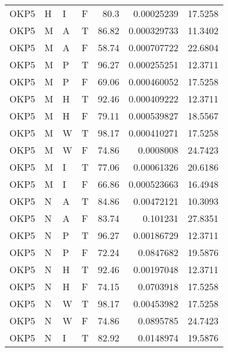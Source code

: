 \begin{longtable}{llllrrr}
    OKP5     & H         & I         & F          & 80.3       & 0.00025239  & 17.5258  \\
    OKP5     & M         & A         & T          & 86.82      & 0.000329733 & 11.3402  \\
    OKP5     & M         & A         & F          & 58.74      & 0.000707722 & 22.6804  \\
    OKP5     & M         & P         & T          & 96.27      & 0.000255251 & 12.3711  \\
    OKP5     & M         & P         & F          & 69.06      & 0.000460052 & 17.5258  \\
    OKP5     & M         & H         & T          & 92.46      & 0.000409222 & 12.3711  \\
    OKP5     & M         & H         & F          & 79.11      & 0.000539827 & 18.5567  \\
    OKP5     & M         & W         & T          & 98.17      & 0.000410271 & 17.5258  \\
    OKP5     & M         & W         & F          & 74.86      & 0.0008008   & 24.7423  \\
    OKP5     & M         & I         & T          & 77.06      & 0.00061326  & 20.6186  \\
    OKP5     & M         & I         & F          & 66.86      & 0.000523663 & 16.4948  \\
    OKP5     & N         & A         & T          & 84.86      & 0.00472121  & 10.3093  \\
    OKP5     & N         & A         & F          & 83.74      & 0.101231    & 27.8351  \\
    OKP5     & N         & P         & T          & 96.27      & 0.00186729  & 12.3711  \\
    OKP5     & N         & P         & F          & 72.24      & 0.0847682   & 19.5876  \\
    OKP5     & N         & H         & T          & 92.46      & 0.00197048  & 12.3711  \\
    OKP5     & N         & H         & F          & 74.15      & 0.0703918   & 17.5258  \\
    OKP5     & N         & W         & T          & 98.17      & 0.00453982  & 17.5258  \\
    OKP5     & N         & W         & F          & 74.86      & 0.0895785   & 24.7423  \\
    OKP5     & N         & I         & T          & 82.92      & 0.0148974   & 19.5876  \\

\end{longtable}
